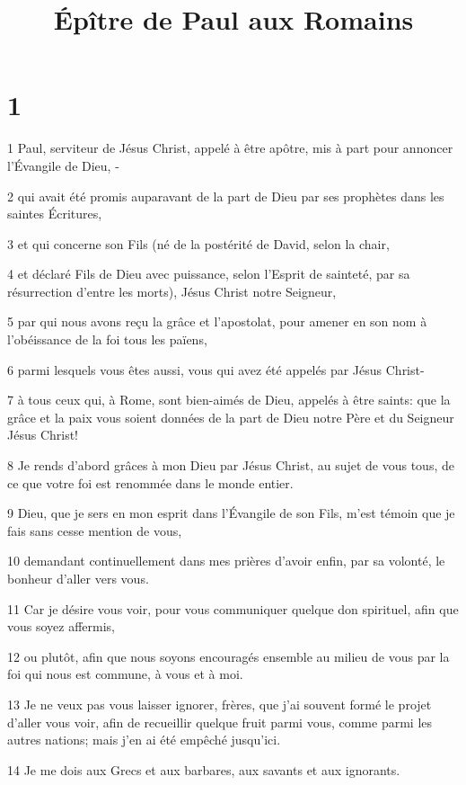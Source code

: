 

\title{Épître de Paul aux Romains}


\chapter{1}

\par 1 Paul, serviteur de Jésus Christ, appelé à être apôtre, mis à part pour annoncer l'Évangile de Dieu, -
\par 2 qui avait été promis auparavant de la part de Dieu par ses prophètes dans les saintes Écritures,
\par 3 et qui concerne son Fils (né de la postérité de David, selon la chair,
\par 4 et déclaré Fils de Dieu avec puissance, selon l'Esprit de sainteté, par sa résurrection d'entre les morts), Jésus Christ notre Seigneur,
\par 5 par qui nous avons reçu la grâce et l'apostolat, pour amener en son nom à l'obéissance de la foi tous les païens,
\par 6 parmi lesquels vous êtes aussi, vous qui avez été appelés par Jésus Christ-
\par 7 à tous ceux qui, à Rome, sont bien-aimés de Dieu, appelés à être saints: que la grâce et la paix vous soient données de la part de Dieu notre Père et du Seigneur Jésus Christ!
\par 8 Je rends d'abord grâces à mon Dieu par Jésus Christ, au sujet de vous tous, de ce que votre foi est renommée dans le monde entier.
\par 9 Dieu, que je sers en mon esprit dans l'Évangile de son Fils, m'est témoin que je fais sans cesse mention de vous,
\par 10 demandant continuellement dans mes prières d'avoir enfin, par sa volonté, le bonheur d'aller vers vous.
\par 11 Car je désire vous voir, pour vous communiquer quelque don spirituel, afin que vous soyez affermis,
\par 12 ou plutôt, afin que nous soyons encouragés ensemble au milieu de vous par la foi qui nous est commune, à vous et à moi.
\par 13 Je ne veux pas vous laisser ignorer, frères, que j'ai souvent formé le projet d'aller vous voir, afin de recueillir quelque fruit parmi vous, comme parmi les autres nations; mais j'en ai été empêché jusqu'ici.
\par 14 Je me dois aux Grecs et aux barbares, aux savants et aux ignorants.
